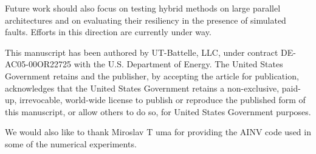 \documentclass[times]{nlaauth}
\begin{document}
Future work should also focus on testing hybrid methods on
large parallel architectures and on evaluating their resiliency in the presence
of simulated faults. Efforts in this direction are currently under way.

\acks
 This manuscript
  has been authored by UT-Battelle, LLC, under contract DE-AC05-00OR22725
  with the U.S. Department of Energy. The United States Government retains
  and the publisher, by accepting the article for publication, acknowledges
  that the United States Government retains a non-exclusive, paid-up,
  irrevocable, world-wide license to publish or reproduce the published form
  of this manuscript, or allow others to do so, for United States Government
  purposes.

 We would also like to thank Miroslav T uma for
providing the AINV code used
in some of the numerical experiments.
\end{document}

